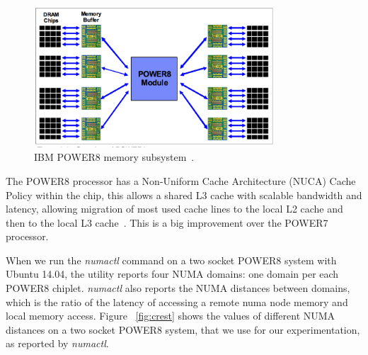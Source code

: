 \begin{figure}[h!]
  \centering
  \includegraphics[height=0.4\textwidth, width=0.8\textwidth]{./Images/P8_memory.pdf}
       \caption{IBM POWER8 memory subsystem~\cite{IBM_P8}.}
       \label{fig:p8_2}
\end{figure}
The POWER8 processor has a Non-Uniform Cache Architecture (NUCA) Cache Policy within the chip, this allows a shared L3 cache with scalable bandwidth and latency, allowing migration of most used cache lines to the local L2 cache and then to the local L3 cache~\cite{IBM_P8}. This is a big improvement over the POWER7 processor.  

When we run the \textit{numactl} command on a two socket POWER8 system with Ubuntu 14.04, the utility reports four NUMA domains: one domain per each POWER8 chiplet. \textit{numactl}  also reports the NUMA distances between domains, which is the ratio of the latency of accessing  a remote numa node memory and local memory access. Figure ~\ref{fig:crest} shows the values of different NUMA distances on a two socket POWER8 system, that we use for our experimentation, as reported by \textit{numactl}.

